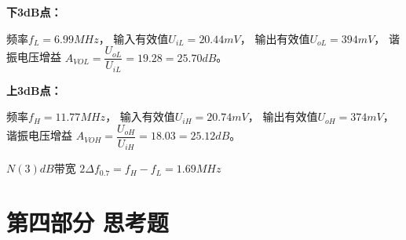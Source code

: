 \documentclass[UTF8]{ctexart}
\begin{document}
\begin{enumerate}[(1)]
    \vspace{-2em}
    \textbf{下3dB点：}

    频率$f_L=6.99MHz$，
    输入有效值$U_{iL}=20.44mV$，
    输出有效值$U_{oL}=394mV$，
    谐振电压增益 $A_{VOL}=\dfrac{U_{oL}}{U_{iL}}=19.28=25.70dB$。

    \textbf{上3dB点：}

    频率$f_H=11.77MHz$，
    输入有效值$U_{iH}=20.74mV$，
    输出有效值$U_{oH}=374mV$，
    谐振电压增益 $A_{VOH}=\dfrac{U_{oH}}{U_{iH}}=18.03=25.12dB$。

    $N(3)dB$带宽 $2\Delta f_{0.7}=f_H-f_L=1.69MHz$
    
\end{enumerate}

\section{第四部分 \texorpdfstring{\quad}{} 思考题}
\end{document}
